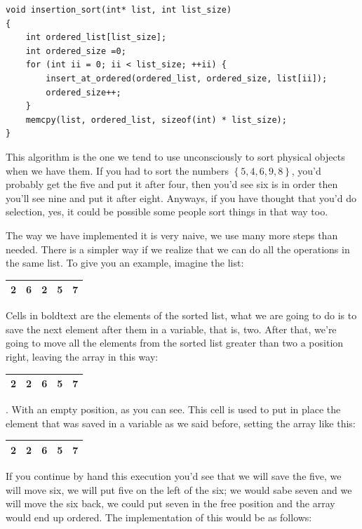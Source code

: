 \documentclass[a4paper]{article}
\begin{document}
\noindent
\begin{minipage}[H]{\linewidth}
\mbox{}
\begin{lstlisting}[style=C,
caption={Insert algorithm},
label={lst:insertionSort}]
void insertion_sort(int* list, int list_size)
{
    int ordered_list[list_size];
    int ordered_size =0;
    for (int ii = 0; ii < list_size; ++ii) {
        insert_at_ordered(ordered_list, ordered_size, list[ii]);
        ordered_size++;
    }
    memcpy(list, ordered_list, sizeof(int) * list_size);
}
\end{lstlisting}
\end{minipage}

This algorithm is the one we tend to use unconsciously to sort physical objects
when we have them. If you had to sort the numbers $\left\{5,4,6,9,8\right\}$,
you'd probably get the five and put it after four, then you'd see six is in
order then you'll see nine and put it after eight. Anyways, if you have thought
that you'd do selection, yes, it could be possible some people sort things in
that way too.

The way we have implemented it is very naive, we use many more steps than
needed. There is a simpler way if we realize that we can do all the operations
in the same list. To give you an example, imagine the list:
\begin{tabular}{|c|c|c|c|c|}
\hline
\textbf{2}&\textbf{6}&2&5&7\\\hline
\end{tabular}
Cells in boldtext are the elements of the sorted list, what we are going to do
is to save the next element after them in a variable, that is, two. After that,
we're going to move all the elements from the sorted list greater than two a
position right, leaving the array in this way:
\begin{tabular}{|c|c|c|c|c|}
\hline
\textbf{2}&\color{white}2\normalcolor&\textbf{6}&5&7\\\hline
\end{tabular}.
With an empty position, as you can see. This cell is used to put in place the
element that was saved in a variable as we said before, setting the array like
this:
\begin{tabular}{|c|c|c|c|c|}
\hline
\textbf{2}&\textbf{2}&\textbf{6}&5&7\\\hline
\end{tabular}
If you continue by hand this execution you'd see that we will save the five,
we will move six, we will put five on the left of the six; we would sabe seven
and we will move the six back, we could put seven in the free position and the
array would end up ordered. The implementation of this would be as follows:
\end{document}
